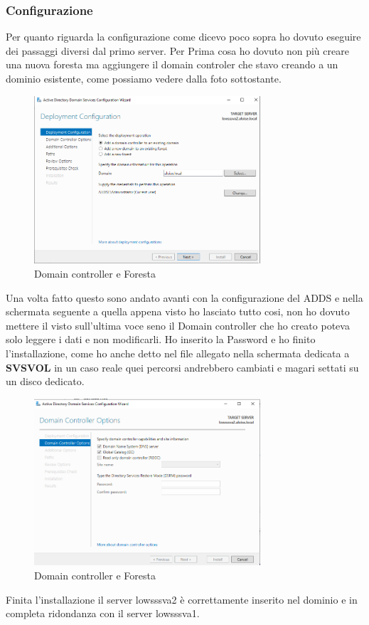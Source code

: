 \documentclass[../main.tex]{subfiles}
\begin{document}
\subsubsection{Configurazione}
Per quanto riguarda la configurazione come dicevo poco sopra ho dovuto eseguire dei passaggi diversi dal primo server. Per Prima cosa ho dovuto non più creare una nuova foresta ma aggiungere il domain controler che stavo creando a un dominio esistente, come possiamo vedere dalla foto sottostante.


\begin{figure}[h]
    \centering
    \includegraphics[width=0.75\textwidth]{Images/ad3.PNG}
    \caption{Domain controller e Foresta}
\end{figure}
\pagebreak{}
\thispagestyle{header-pages}

Una volta fatto questo sono andato avanti con la configurazione del ADDS e nella schermata seguente a quella appena visto ho lasciato tutto cosi, non ho dovuto mettere il visto sull'ultima voce seno il Domain controller che ho creato poteva solo leggere i dati e non modificarli. Ho inserito la Password e ho finito l'installazione, come ho anche detto nel file allegato nella schermata  dedicata a \textbf{SVSVOL} in un caso reale quei percorsi andrebbero cambiati e magari settati su un disco dedicato. 

\begin{figure}[h]
    \centering
    \includegraphics[width=0.75\textwidth]{Images/ad4.PNG}
    \caption{Domain controller e Foresta}
\end{figure}
Finita l'installazione il server lowsssva2 è correttamente inserito nel dominio e in completa ridondanza con il server lowsssva1.
\end{document}
